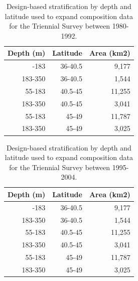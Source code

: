 \documentclass[
  english,
]{article}
\begin{document}
\endgroup

\pagebreak

\begingroup
\fontsize{9.0pt}{11.0pt}\selectfont

\begin{longtable}{rrr}

\caption{\label{tbl-tri-early-strata}Design-based stratification by
depth and latitude used to expand composition data for the Triennial
Survey between 1980-1992.}

\tabularnewline

\toprule
Depth (m) & Latitude & Area (km2) \\ 
\midrule\addlinespace[2.5pt]
55-183 & 36-40.5 & 9,177 \\ 
183-350 & 36-40.5 & 1,544 \\ 
55-183 & 40.5-45 & 11,255 \\ 
183-350 & 40.5-45 & 3,041 \\ 
55-183 & 45-49 & 11,787 \\ 
183-350 & 45-49 & 3,025 \\ 
\bottomrule

\end{longtable}

\endgroup

\begingroup
\fontsize{9.0pt}{11.0pt}\selectfont

\begin{longtable}{rrr}

\caption{\label{tbl-tri-late-strata}Design-based stratification by depth
and latitude used to expand composition data for the Triennial Survey
between 1995-2004.}

\tabularnewline

\toprule
Depth (m) & Latitude & Area (km2) \\ 
\midrule\addlinespace[2.5pt]
55-183 & 36-40.5 & 9,177 \\ 
183-350 & 36-40.5 & 1,544 \\ 
55-183 & 40.5-45 & 11,255 \\ 
183-350 & 40.5-45 & 3,041 \\ 
55-183 & 45-49 & 11,787 \\ 
183-350 & 45-49 & 3,025 \\ 
\bottomrule

\end{longtable}

\endgroup

\pagebreak
\end{document}
